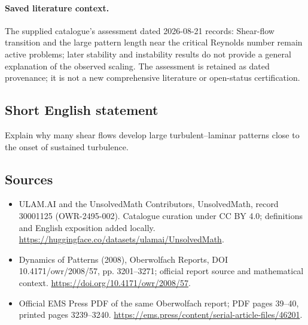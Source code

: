 \documentclass[11pt]{article}
\begin{document}
\paragraph{Saved literature context.} The supplied catalogue's assessment dated 2026-08-21 records: Shear-flow transition and the large pattern length near the critical Reynolds number remain active problems; later stability and instability results do not provide a general explanation of the observed scaling. The assessment is retained as dated provenance; it is not a new comprehensive literature or open-status certification.
\subsection{Short English statement}
Explain why many shear flows develop large turbulent--laminar patterns close to the onset of sustained turbulence.
\subsection{Sources}
\begin{itemize}
\item[\hypertarget{source:30001125:1}{S1}] ULAM.AI and the UnsolvedMath Contributors, UnsolvedMath, record 30001125 (OWR-2495-002). Catalogue curation under CC BY 4.0; definitions and English exposition added locally.
\url{https://huggingface.co/datasets/ulamai/UnsolvedMath}.
\item[\hypertarget{source:30001125:2}{S2}] Dynamics of Patterns (2008), Oberwolfach Reports, DOI 10.4171/owr/2008/57, pp. 3201--3271; official report source and mathematical context.
\url{https://doi.org/10.4171/owr/2008/57}.
\item[\hypertarget{source:30001125:3}{S3}] Official EMS Press PDF of the same Oberwolfach report; PDF pages 39--40, printed pages 3239--3240.
\url{https://ems.press/content/serial-article-files/46201}.
\end{itemize}
\label{end:30001125}
\end{document}
